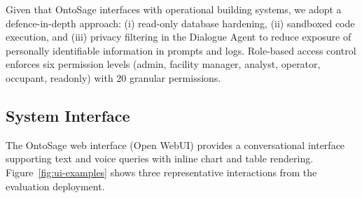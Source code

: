 \documentclass[acmsmall]{acmart}
\begin{document}
Given that OntoSage interfaces with operational building systems, we adopt a defence-in-depth approach: (i) read-only database hardening, (ii) sandboxed code execution, and (iii) privacy filtering in the Dialogue Agent to reduce exposure of personally identifiable information in prompts and logs. Role-based access control enforces six permission levels (admin, facility manager, analyst, operator, occupant, readonly) with 20 granular permissions.

\subsection{System Interface}

The OntoSage web interface (Open WebUI) provides a conversational interface supporting text and voice queries with inline chart and table rendering. Figure~\ref{fig:ui-examples} shows three representative interactions from the evaluation deployment.
\end{document}
